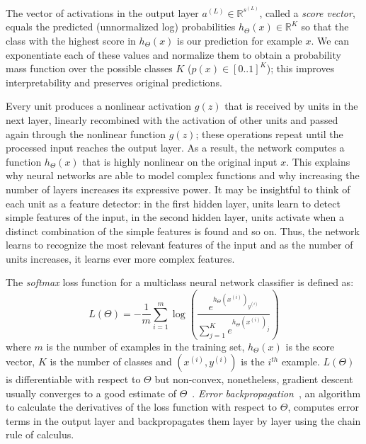 The vector of activations in the output layer $a^{(L)} \in \mathbb{R}^{s^{(L)}}$, called a \emph{score vector}, equals the predicted (unnormalized log) probabilities $h_\Theta(x) \in \mathbb{R}^K$ so that the class with the highest score in $h_\Theta(x)$ is our prediction for example $x$. We can exponentiate each of these values and normalize them to obtain a probability mass function over the possible classes $K$ ($p(x) \in [0..1]^K$); this improves interpretability and preserves original predictions.

Every unit produces a nonlinear activation $g(z)$ that is received by units in the next layer, linearly recombined with the activation of other units and passed again through the nonlinear function $g(z)$; these operations repeat until the processed input reaches the output layer. As a result, the network computes a function $h_\Theta(x)$ that is highly nonlinear on the original input $x$. This explains why neural networks are able to model complex functions and why increasing the number of layers increases its expressive power. It may be insightful to think of each unit as a feature detector: in the first hidden layer, units learn to detect simple features of the input, in the second hidden layer, units activate when a distinct combination of the simple features is found and so on. Thus, the network learns to recognize the most relevant features of the input and as the number of units increases, it learns ever more complex features.

The \emph{softmax} loss function for a multiclass neural network classifier is defined as:
\begin{equation}
	L(\Theta) = -\frac{1}{m} \sum_{i=1}^m \log \left ( \frac{ e^{h_\Theta(x^{(i)})_{y^{(i)}}} }{ \sum_{j=1}^K e^{ h_\Theta (x^{(i)})_j} } \right )
\end{equation}
where $m$ is the number of examples in the training set, $h_\Theta(x)$ is the score vector, $K$ is the number of classes and $(x^{(i)},y^{(i)})$ is the $i^{th}$ example. $L(\Theta)$ is differentiable with respect to $\Theta$ but non-convex, nonetheless, gradient descent usually converges to a good estimate of $\Theta$~\cite{Ng2014}. \emph{Error backpropagation}~\cite{Linnainmaa1970, Werbos1974}, an algorithm to calculate the derivatives of the loss function with respect to $\Theta$, computes error terms in the output layer and backpropagates them layer by layer using the chain rule of calculus.

